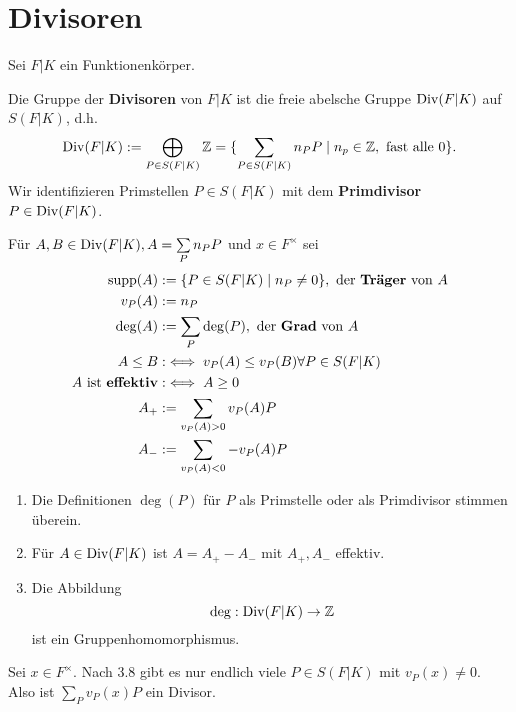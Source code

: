 \section{Divisoren}
Sei $F|K$ ein Funktionenkörper.

\begin{definition}
    Die Gruppe der \textbf{Divisoren} von $F|K$ ist die freie abelsche Gruppe $\operatorname{Div}(F|K)$ auf $S(F|K)$, d.h.
    $$ \operatorname{Div}(F|K) := \bigoplus\limits_{P \in S(F|K)} \mathbb{Z} = \{\sum\limits_{P \in S(F|K)} n_P P \mid n_p \in \mathbb{Z}, \text{ fast alle }0\}.$$
    Wir identifizieren Primstellen $P \in S(F|K)$ mit dem \textbf{Primdivisor} $P \in \operatorname{Div}(F|K)$.

    Für $A,B \in \operatorname{Div}(F|K), A = \sum\limits_P n_P P$ und $x \in F^{\times}$ sei 
    \begin{align*}
        \operatorname{supp}(A) &:= \{P \in S(F|K) \mid n_P \ne 0\}, \text{ der \textbf{Träger} von }A\\
        v_P(A) &:= n_P\\
        \deg(A) &:= \sum\limits_P \deg(P), \text{ der \textbf{Grad} von }A\\
        A \leq B &:\iff v_P(A) \leq v_P(B) \forall P \in S(F|K)\\
        A \text{ ist \textbf{effektiv}} &:\iff A \geq 0\\
        A_+ &:= \sum\limits_{v_P(A) > 0} v_P(A) P\\
        A_- &:= \sum\limits_{v_P(A) < 0} -v_P(A) P
    \end{align*}
\end{definition}

\begin{bemerkungnr}
    \begin{enumerate}
        \item Die Definitionen $\deg(P)$ für $P$ als Primstelle oder als Primdivisor stimmen überein.
        \item Für $A \in \operatorname{Div}(F|K)$ ist $A = A_+ - A_-$ mit $A_+,A_-$ effektiv.
        \item Die Abbildung
        $$ \deg: \operatorname{Div}(F|K) \to \mathbb{Z}$$
        ist ein Gruppenhomomorphismus.
    \end{enumerate}
\end{bemerkungnr}

\begin{beispiel}
    
    Sei $x \in F^{\times}$. Nach 3.8 gibt es nur endlich viele $P \in S(F|K)$ mit $v_P(x) \ne 0$.
    Also ist $\sum\limits_P v_P(x) P$ ein Divisor.
\end{beispiel}

